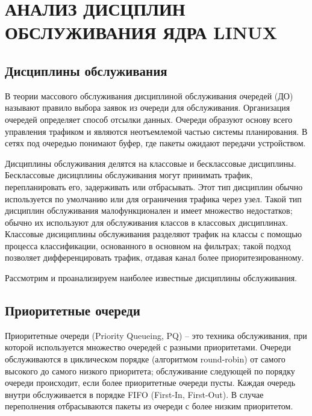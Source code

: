 \section{АНАЛИЗ ДИСЦПЛИН ОБСЛУЖИВАНИЯ ЯДРА LINUX}

    \subsection{Дисциплины обслуживания}

	В теории массового обслуживания дисциплиной обслуживания очередей (ДО) называют правило выбора заявок
	из очереди для обслуживания\cite{Aliev}. Организация очередей
	определяет способ отсылки данных. Очереди образуют основу всего
	управления трафиком и являются неотъемлемой частью системы
	планирования. В сетях под очередью понимают буфер, где пакеты
	ожидают передачи устройством. \cite{trafficctl}

	Дисциплины обслуживания делятся на классовые и бесклассовые дисциплины.
	Бесклассовые дисицплины обслуживания могут принимать трафик,
	перепланировать его, задерживать или отбрасывать. Этот тип дисциплин
	обычно используется по умолчанию или для ограничения трафика через узел.
	Такой тип дисциплин обслуживания малофункционален и имеет множество недостатков;
	обычно их используют для обслуживания классов в классовых дисциплинах.
	Классовые дисициплины обслуживания разделяют трафик на классы с помощью
	процесса классификации, основанного в основном на фильтрах; такой подход
	позволяет дифференцировать трафик, отдавая канал более приоритезированному.\cite{lartc}

	Рассмотрим и проанализируем наиболее известные дисциплины обслуживания.

    \subsection{Приоритетные очереди}

    Приоритетные очереди (Priority Queueing, PQ) -- это техника обслуживания,
    при которой используется множество очередей с разными приоритетами. Очереди
    обслуживаются в циклическом порядке (алгоритмом round-robin) от самого высокого 
    до самого низкого приоритета; обслуживание следующей по порядку очереди происходит,
    если более приоритетные очереди пусты. Каждая очередь внутри обслуживается в порядке FIFO
    (First-In, First-Out). В случае переполнения отбрасываются пакеты из очереди
    с более низким приоритетом.\cite{packethandling}
    
